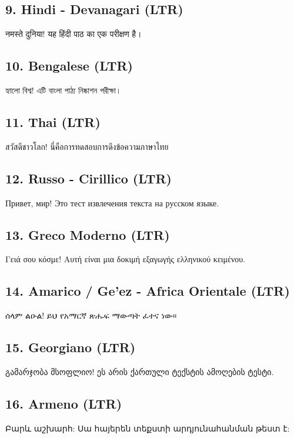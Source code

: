 \documentclass[12pt,a4paper]{article}
\begin{document}
\subsection*{9. Hindi - Devanagari (LTR)}
{\devanagarifont नमस्ते दुनिया}! {\devanagarifont यह हिंदी पाठ का एक परीक्षण है।}

\subsection*{10. Bengalese (LTR)}
{\bengalifont হ্যালো বিশ্ব}! {\bengalifont এটি বাংলা পাঠ্য নিষ্কাশন পরীক্ষা।}

\subsection*{11. Thai (LTR)}
{\thaifont สวัสดีชาวโลก}! {\thaifont นี่คือการทดสอบการดึงข้อความภาษาไทย}

\subsection*{12. Russo - Cirillico (LTR)}
Привет, мир! Это тест извлечения текста на русском языке.

\subsection*{13. Greco Moderno (LTR)}
Γειά σου κόσμε! Αυτή είναι μια δοκιμή εξαγωγής ελληνικού κειμένου.

\subsection*{14. Amarico / Ge'ez - Africa Orientale (LTR)}
{\ethiopicfont ሰላም ልዑል}! {\ethiopicfont ይህ የአማርኛ ጽሑፍ ማውጣት ፈተና ነው።}

\subsection*{15. Georgiano (LTR)}
{\georgianfont გამარჯობა მსოფლიო}! {\georgianfont ეს არის ქართული ტექსტის ამოღების ტესტი.}

\subsection*{16. Armeno (LTR)}
{\armenianfont Բարև աշխարհ}: {\armenianfont Սա հայերեն տեքստի արդյունահանման թեստ է:}
\end{document}
